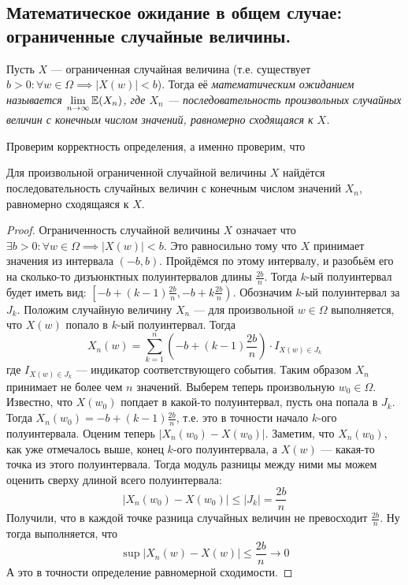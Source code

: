 \subsection{Математическое ожидание в общем случае: ограниченные случайные величины.}
\begin{definition}
    Пусть $X$ --- ограниченная случайная величина (т.е. существует $b > 0 \colon \forall w \in \Omega \implies |X(w)| < b$). Тогда
    её \it{математическим ожиданием} называется $\lim\limits_{n \to \infty} \mathbb{E}(X_n)$, где $X_n$ --- последовательность произвольных
    случайных величин с конечным числом значений, равномерно сходящаяся к $X$.
\end{definition}
Проверим корректность определения, а именно проверим, что
\begin{lemma}
    Для произвольной ограниченной случайной величины $X$ найдётся последовательность случайных величин с конечным числом значений
    $X_n$, равномерно сходящаяся к $X$.
\end{lemma}
\begin{proof}
    Ограниченность случайной величины $X$ означает что $\exists b > 0 \colon \forall w \in \Omega \implies |X(w)| < b$. Это
    равносильно тому что $X$ принимает значения из интервала $(-b, b)$. Пройдёмся по этому интервалу, и разобьём его на сколько-то
    дизъюнктных полуинтервалов длины $\frac{2b}{n}$. Тогда $k$-ый полуинтервал будет иметь вид:
    $\left[-b + (k - 1)\frac{2b}{n}, -b + k\frac{2b}{n}\right)$. Обозначим $k$-ый полуинтервал за $J_k$. Положим случайную величину
    $X_n$ --- для произвольной $w \in \Omega$ выполняется, что $X(w)$ попало в $k$-ый полуинтервал. Тогда
    \[
        X_n(w) = \sum\limits_{k = 1}^{n} \left( -b + (k - 1)\frac{2b}{n} \right) \cdot I_{X(w) \in J_k}
    \]
    где $I_{X(w) \in J_k}$ --- индикатор соответствующего события. Таким образом $X_n$ принимает не более чем $n$ значений.
    Выберем теперь произвольную $w_0 \in \Omega$. Известно, что $X(w_0)$ попдает в какой-то полуинтервал, пусть она попала в
    $J_k$. Тогда $X_n(w_0) = -b + (k - 1)\frac{2b}{n}$, т.е. это в точности начало $k$-ого полуинтервала. Оценим теперь
    $|X_n(w_0) - X(w_0)|$. Заметим, что $X_n(w_0)$, как уже отмечалось выше, конец $k$-ого полуинтервала, а $X(w)$ --- какая-то
    точка из этого полуинтервала. Тогда модуль разницы между ними мы можем оценить сверху длиной всего полуинтервала:
    \[
        |X_n(w_0) - X(w_0)| \leq \left| J_k \right| = \frac{2b}{n}
    \]
    Получили, что в каждой точке разница случайных величин не превосходит $\frac{2b}{n}$. Ну тогда выполняется, что
    \[
        \sup|X_n(w) - X(w)| \leq \frac{2b}{n} \to 0
    \]
    А это в точности определение равномерной сходимости.
\end{proof}
